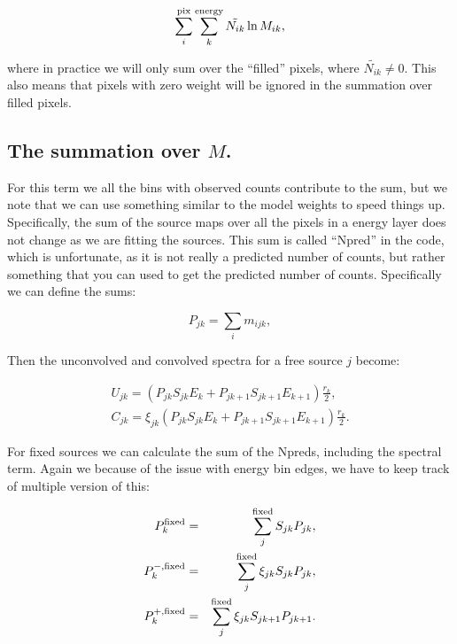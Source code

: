 \documentclass[preprint]{aastex}
\begin{document}
\begin{equation}
  \sum_i^{\rm pix} \sum_k^{\rm energy} \tilde{N_{ik}} \ln M_{ik},
\end{equation}

\noindent where in practice we will only sum over the ``filled''
pixels, where $\tilde{N_{ik}} \ne 0$.  This also means that 
pixels with zero weight will be ignored in the summation over
filled pixels. 


\subsection{The summation over $M$.}\label{subsec:like_sum2}

For this term we all the bins with observed counts contribute to the
sum, but we note that we can use something similar to the model
weights to speed things up.  Specifically, the sum of the source maps
over all the pixels in a energy layer does not change as we are fitting
the sources.  This sum is called ``Npred'' in the code, which is
unfortunate, as it is not really a predicted number of counts, but
rather something that you can used to get the predicted number of
counts.  Specifically we can define the sums:

\begin{equation}
  P_{jk} = \sum_i m_{ijk},
\end{equation}

\noindent Then the unconvolved and convolved spectra for a free
source $j$ become:

\begin{eqnarray}\label{eq:spectra_no_weights}
  U_{jk} = ( P_{jk} S_{jk} E_k + P_{jk+1} S_{jk+1} E_{k+1} ) \frac{r_k}{2},  \nonumber \\
  C_{jk} = \xi_{jk} ( P_{jk} S_{jk} E_k + P_{jk+1} S_{jk+1} E_{k+1} ) \frac{r_k}{2}.
\end{eqnarray}

For fixed sources we can calculate the sum of the Npreds, including the
spectral term.  Again we because of the issue with energy bin edges, 
we have to keep track of multiple version of this:

\begin{eqnarray}
  P_{k}^{\rm fixed} & = & \sum_j^{\rm fixed} S_{jk} P_{jk}, \nonumber \\
  P_{k}^{-, \rm fixed} & = & \sum_j^{\rm fixed} \xi_{jk} S_{jk} P_{jk},  \nonumber \\
  P_{k}^{+, \rm fixed} & = & \sum_j^{\rm fixed} \xi_{jk} S_{jk+1} P_{jk+1}.
\end{eqnarray}
\end{document}
